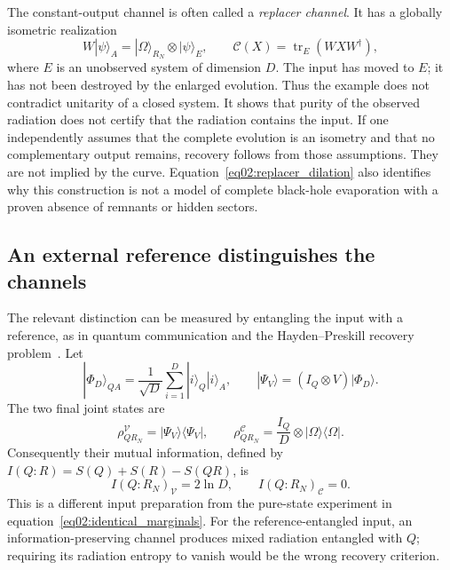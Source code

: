 \documentclass[11pt,letterpaper]{article}
\theoremstyle{plain}
\theoremstyle{definition}
\theoremstyle{remark}
\newcommand{\Ccal}{\mathcal{C}}
\newcommand{\Vcal}{\mathcal{V}}
\DeclareMathOperator{\tr}{tr}
\begin{document}
The constant-output channel is often called a \emph{replacer channel}.
It has a globally isometric realization
\begin{equation}
 W|\psi\rangle_A
 =|\Omega\rangle_{R_N}\otimes|\psi\rangle_E,
 \qquad \Ccal(X)=\tr_E(WXW^\dagger),
 \label{eq02:replacer_dilation}
\end{equation}
where $E$ is an unobserved system of dimension $D$. The input has moved
to $E$; it has not been destroyed by the enlarged evolution. Thus the
example does not contradict unitarity of a closed system. It shows
that purity of the observed radiation does not certify that the
radiation contains the input. If one independently assumes that the
complete evolution is an isometry and that no complementary output
remains, recovery follows from those assumptions. They are not implied
by the curve. Equation~\eqref{eq02:replacer_dilation} also identifies
why this construction is not a model of complete black-hole
evaporation with a proven absence of remnants or hidden sectors.

\subsection{An external reference distinguishes the channels}
\label{subsec02:reference_test}

The relevant distinction can be measured by entangling the input with
a reference, as in quantum communication and the Hayden--Preskill
recovery problem~\citep{schumacher1996,haydenpreskill2007}. Let
\begin{equation}
 |\Phi_D\rangle_{QA}=\frac1{\sqrt D}
 \sum_{i=1}^{D}|i\rangle_Q|i\rangle_A,
 \qquad |\Psi_V\rangle=(I_Q\otimes V)|\Phi_D\rangle.
 \label{eq02:reference_input}
\end{equation}
The two final joint states are
\begin{equation}
 \rho_{QR_N}^{\Vcal}=|\Psi_V\rangle\langle\Psi_V|,
 \qquad
 \rho_{QR_N}^{\Ccal}=\frac{I_Q}{D}\otimes
 |\Omega\rangle\langle\Omega|.
 \label{eq02:reference_outputs}
\end{equation}
Consequently their mutual information, defined by
$I(Q:R)=S(Q)+S(R)-S(QR)$, is
\begin{equation}
 I(Q:R_N)_{\Vcal}=2\ln D,
 \qquad I(Q:R_N)_{\Ccal}=0.
 \label{eq02:reference_mutual_information}
\end{equation}
This is a different input preparation from the pure-state experiment
in equation~\eqref{eq02:identical_marginals}. For the reference-entangled
input, an information-preserving channel produces mixed radiation
entangled with $Q$; requiring its radiation entropy to vanish would
be the wrong recovery criterion.
\end{document}
